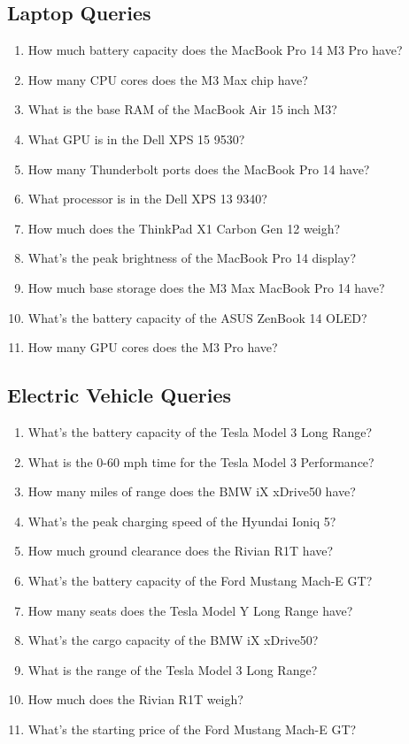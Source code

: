 \documentclass[11pt, a4paper]{article}
\theoremstyle{definition}
\begin{document}
\subsection{Laptop Queries}
\begin{enumerate}
    \item How much battery capacity does the MacBook Pro 14 M3 Pro have?
    \item How many CPU cores does the M3 Max chip have?
    \item What is the base RAM of the MacBook Air 15 inch M3?
    \item What GPU is in the Dell XPS 15 9530?
    \item How many Thunderbolt ports does the MacBook Pro 14 have?
    \item What processor is in the Dell XPS 13 9340?
    \item How much does the ThinkPad X1 Carbon Gen 12 weigh?
    \item What's the peak brightness of the MacBook Pro 14 display?
    \item How much base storage does the M3 Max MacBook Pro 14 have?
    \item What's the battery capacity of the ASUS ZenBook 14 OLED?
    \item How many GPU cores does the M3 Pro have?
\end{enumerate}

\subsection{Electric Vehicle Queries}
\begin{enumerate}
    \item What's the battery capacity of the Tesla Model 3 Long Range?
    \item What is the 0-60 mph time for the Tesla Model 3 Performance?
    \item How many miles of range does the BMW iX xDrive50 have?
    \item What's the peak charging speed of the Hyundai Ioniq 5?
    \item How much ground clearance does the Rivian R1T have?
    \item What's the battery capacity of the Ford Mustang Mach-E GT?
    \item How many seats does the Tesla Model Y Long Range have?
    \item What's the cargo capacity of the BMW iX xDrive50?
    \item What is the range of the Tesla Model 3 Long Range?
    \item How much does the Rivian R1T weigh?
    \item What's the starting price of the Ford Mustang Mach-E GT?
\end{enumerate}
\end{document}
